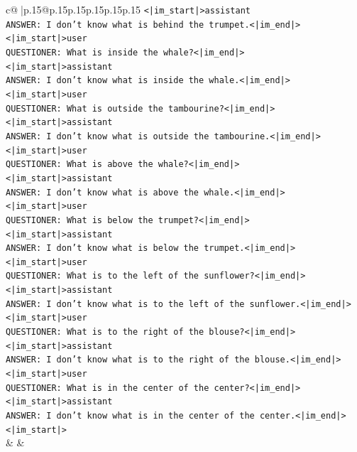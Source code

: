 \documentclass{article}
\begin{document}
{\begin{supertabular}{c@{$\;$}|p{.15\linewidth}@{}p{.15\linewidth}p{.15\linewidth}p{.15\linewidth}p{.15\linewidth}p{.15\linewidth}}
{{{\texttt{<|im\_start|>assistant} \\
\texttt{ANSWER: I don't know what is behind the trumpet.<|im\_end|>} \\
\texttt{<|im\_start|>user} \\
\texttt{QUESTIONER: What is inside the whale?<|im\_end|>} \\
\texttt{<|im\_start|>assistant} \\
\texttt{ANSWER: I don't know what is inside the whale.<|im\_end|>} \\
\texttt{<|im\_start|>user} \\
\texttt{QUESTIONER: What is outside the tambourine?<|im\_end|>} \\
\texttt{<|im\_start|>assistant} \\
\texttt{ANSWER: I don't know what is outside the tambourine.<|im\_end|>} \\
\texttt{<|im\_start|>user} \\
\texttt{QUESTIONER: What is above the whale?<|im\_end|>} \\
\texttt{<|im\_start|>assistant} \\
\texttt{ANSWER: I don't know what is above the whale.<|im\_end|>} \\
\texttt{<|im\_start|>user} \\
\texttt{QUESTIONER: What is below the trumpet?<|im\_end|>} \\
\texttt{<|im\_start|>assistant} \\
\texttt{ANSWER: I don't know what is below the trumpet.<|im\_end|>} \\
\texttt{<|im\_start|>user} \\
\texttt{QUESTIONER: What is to the left of the sunflower?<|im\_end|>} \\
\texttt{<|im\_start|>assistant} \\
\texttt{ANSWER: I don't know what is to the left of the sunflower.<|im\_end|>} \\
\texttt{<|im\_start|>user} \\
\texttt{QUESTIONER: What is to the right of the blouse?<|im\_end|>} \\
\texttt{<|im\_start|>assistant} \\
\texttt{ANSWER: I don't know what is to the right of the blouse.<|im\_end|>} \\
\texttt{<|im\_start|>user} \\
\texttt{QUESTIONER: What is in the center of the center?<|im\_end|>} \\
\texttt{<|im\_start|>assistant} \\
\texttt{ANSWER: I don't know what is in the center of the center.<|im\_end|>} \\
\texttt{<|im\_start|>} \\
            }
        }
    }
    & & \\ \\


\end{supertabular}}
\end{document}
